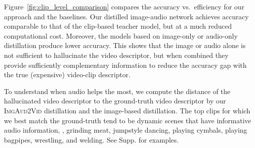 Figure~\ref{fig:clip_level_comparison} compares the accuracy vs.~efficiency for our approach and the baselines. Our distilled image-audio network achieves accuracy comparable to that of the clip-based teacher model, but at a much reduced computational cost. Moreover, the models based on image-only or audio-only distillation produce lower accuracy. This shows that the image or audio alone is not sufficient to hallucinate the video descriptor, but when combined they provide sufficiently complementary information to reduce the accuracy gap with the true (expensive) video-clip descriptor. 

To understand when audio helps the most, we compute the  distance of the hallucinated video descriptor to the ground-truth video descriptor by our \textsc{ImgAud2Vid} distillation and the image-based distillation. The top clips for which we best match the ground-truth tend to be dynamic scenes that have informative audio information, \eg, grinding meat, jumpstyle dancing, playing cymbals, playing bagpipes, wrestling, and welding. See Supp. for examples.

\begin{table*}
\vspace{-1mm}
\caption{Video-level action recognition accuracy (in \%) on ActivityNet (\# classes: 200) and Mini-Sports1M (\# classes: 487). Kinetics-Sounds and UCF-101 consist of only short trimmed videos, so they are not applicable here. Our method consistently outperforms all baseline methods. Ours (sparse) uses only about 1/5 the computation cost of the last four baselines, while achieving large accuracy gains. See Table~\ref{Table:activitynet_sota} for more computation cost comparisons.
\vspace{-0.1in}
}
\vspace{-0.05in}
\label{Table:video_level_comparison}
\end{table*}

